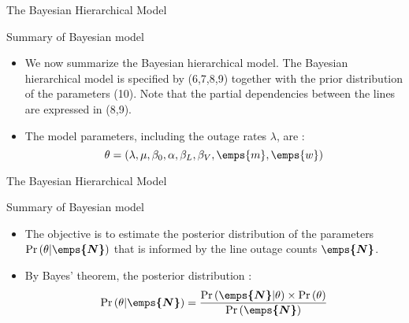 \documentclass{beamer}
\providecommand{\pr}[1]{\ensuremath{\Pr\left(#1\right)}}
\begin{document}
\begin{frame}{The Bayesian Hierarchical Model}
\begin{block}{Summary of Bayesian model}
\begin{itemize}
    \item We now summarize the Bayesian hierarchical model. The
Bayesian hierarchical model is specified by (6,7,8,9) together with the prior distribution of the parameters (10). Note
that the partial dependencies between the lines are expressed in
(8,9).
 \item The model parameters, including the outage rates $\lambda$, are :
\begin{equation}
  \theta = (\lambda, \mu, \beta_0, \alpha, \beta_L, \beta_V ,\emps{m}, \emps{w} )
\end{equation}


\end{itemize}
\end{block}
\end{frame}


\begin{frame}{The Bayesian Hierarchical Model}
\begin{block}{Summary of Bayesian model}
\begin{itemize}
    \item The objective is to estimate the posterior distribution of the
parameters $\pr{\theta|\boldsymbol{\emps{N}}}$ that is informed by the line outage counts
$\boldsymbol{\emps{N}}$.
 \item  By Bayes’ theorem, the posterior distribution :
\begin{equation}
  \pr{\theta|\boldsymbol{\emps{N}}} = \frac{\pr{\boldsymbol{\emps{N}}|\theta}\times \pr{\theta}}{\pr{\boldsymbol{\emps{N}}}}
\end{equation}

\end{itemize}
\end{block}
\end{frame}
\end{document}
